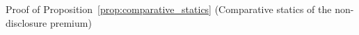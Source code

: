 Proof of Proposition~\ref{prop:comparative_statics} (Comparative statics of the non-disclosure premium)